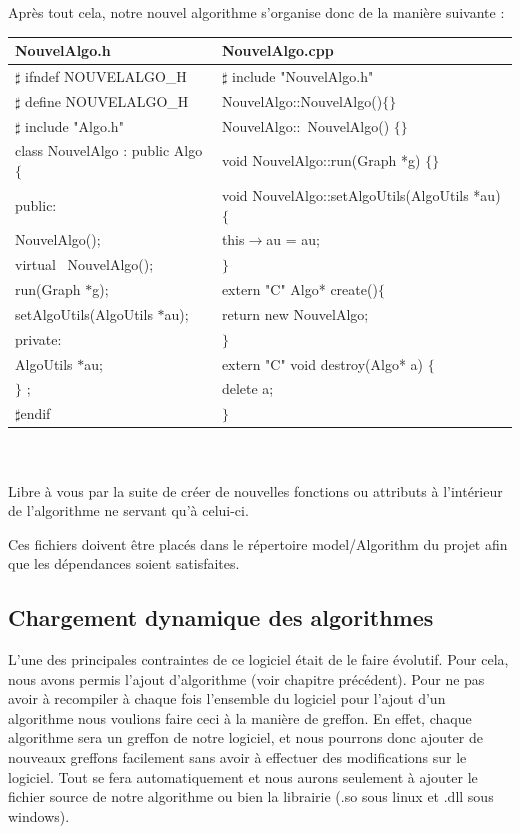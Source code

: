 \documentclass[11pt,a4paper]{article}
\begin{document}
			Après tout cela, notre nouvel algorithme s'organise donc de la manière suivante : 
			
			\begin{tabular}{|l||l|}
				\hline 
				NouvelAlgo.h 								& NouvelAlgo.cpp\\
				\hline
				$\sharp$ ifndef NOUVELALGO\_H 				& $\sharp$ include "NouvelAlgo.h"\\
				$\sharp$ define NOUVELALGO\_H 				& NouvelAlgo::NouvelAlgo()$\lbrace \rbrace$\\
				$\sharp$ include "Algo.h"					& NouvelAlgo::~NouvelAlgo() $\lbrace \rbrace$\\
				class NouvelAlgo : public Algo $\lbrace$ 	& void NouvelAlgo::run(Graph *g) $\lbrace \rbrace$\\
				public: 									& void NouvelAlgo::setAlgoUtils(AlgoUtils *au) $\lbrace $\\
				\indent NouvelAlgo(); 						& \indent this$\rightarrow$au = au;\\
				\indent virtual ~NouvelAlgo(); 				& $\rbrace$\\
				\indent run(Graph $*$g); 					& extern "C" Algo* create()$\lbrace$ \\
				\indent setAlgoUtils(AlgoUtils $*$au);		& \indent return new NouvelAlgo;\\
				private:									& $\rbrace$\\
				\indent AlgoUtils $*$au; 					& extern "C" void destroy(Algo* a) $\lbrace$ \\		
				$\rbrace$ ; 								& \indent delete a;\\
				$\sharp$endif 								& $\rbrace$\\		
				\hline 
			\end{tabular} 
			~\\~\\
			Libre à vous par la suite de créer de nouvelles fonctions ou attributs à l'intérieur de l'algorithme ne servant qu'à celui-ci.
			
			Ces fichiers doivent être placés dans le répertoire model/Algorithm du projet afin que les dépendances soient satisfaites.

		\subsection{Chargement dynamique des algorithmes}
			L'une des principales contraintes de ce logiciel était de le faire évolutif. Pour cela, nous avons permis l'ajout d'algorithme (voir chapitre précédent). Pour ne pas avoir à recompiler à chaque fois l'ensemble du logiciel pour l'ajout d'un algorithme nous voulions faire ceci à la manière de greffon. En effet, chaque algorithme sera un greffon de notre logiciel, et nous pourrons donc ajouter de nouveaux greffons facilement sans avoir à effectuer des modifications sur le logiciel. Tout se fera automatiquement et nous aurons seulement à ajouter le fichier source de notre algorithme ou bien la librairie (.so sous linux et .dll sous windows).
			
\end{document}

